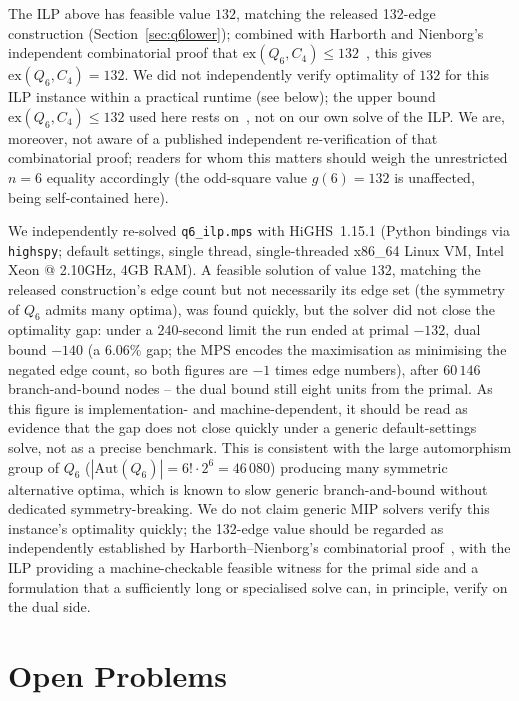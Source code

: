 \documentclass[12pt]{article}
\newcommand{\ex}{\mathrm{ex}}
\begin{document}
\begin{proposition}\label{prop:q6ilp}
The ILP above has feasible value $132$, matching the released 132-edge
construction (Section~\ref{sec:q6lower}); combined with
Harborth and Nienborg's independent combinatorial proof
that $\ex(Q_6,C_4)\le132$~\cite{HN94}, this gives $\ex(Q_6,C_4)=132$.
We did not independently verify optimality of $132$ for this ILP
instance within a practical runtime (see below); the upper bound
$\ex(Q_6,C_4)\le132$ used here rests on~\cite{HN94}, not on our own
solve of the ILP. We are, moreover, not aware of a published independent
re-verification of that combinatorial proof; readers for whom this matters
should weigh the unrestricted $n=6$ equality accordingly (the odd-square
value $g(6)=132$ is unaffected, being self-contained here).
\end{proposition}

We independently re-solved \texttt{q6\_ilp.mps} with HiGHS~1.15.1
(Python bindings via \texttt{highspy}; default settings, single thread,
single-threaded x86\_64 Linux VM, Intel Xeon @ 2.10GHz, 4GB RAM). A
feasible solution of value $132$, matching the released construction's edge
count but not necessarily its edge set (the symmetry of $Q_6$ admits many
optima), was found quickly, but the solver did not close the optimality gap:
under a $240$-second limit the run ended at primal $-132$, dual bound $-140$
(a $6.06\%$ gap; the MPS encodes the maximisation as minimising the
negated edge count, so both figures are $-1$ times edge numbers), after $60\,146$ branch-and-bound nodes -- the dual bound
still eight units from the primal.
As this figure is implementation- and
machine-dependent, it should be read as evidence that the gap does
not close quickly under a generic default-settings solve, not as a
precise benchmark. This is
consistent with the large automorphism group of $Q_6$
($|\mathrm{Aut}(Q_6)|=6!\cdot2^6=46\,080$) producing many symmetric
alternative optima, which is known to slow generic branch-and-bound
without dedicated symmetry-breaking. We do not claim generic MIP
solvers verify this instance's optimality quickly; the 132-edge value
should be regarded as independently established by
Harborth--Nienborg's combinatorial proof~\cite{HN94}, with the ILP
providing a machine-checkable feasible witness for the primal side and
a formulation that a sufficiently long or specialised solve can, in
principle, verify on the dual side.

\section{Open Problems}\label{sec:open}
\end{document}
